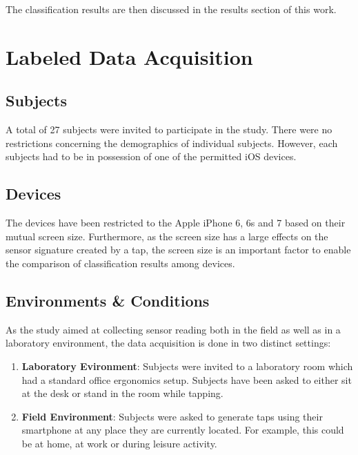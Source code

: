 The classification results are then discussed in the results section of this work.



\section{Labeled Data Acquisition}

\subsection{Subjects}
A total of 27 subjects were invited to participate in the study. There were no restrictions concerning the demographics of individual subjects. However, each subjects had to be in  possession of one of the permitted iOS devices.

\subsection{Devices}
The devices have been restricted to the Apple iPhone 6, 6s and 7 based on their mutual screen size. Furthermore, as the screen size has a large effects on the sensor signature created by a tap, the screen size is an important factor to enable the comparison of classification results among devices.

\subsection{Environments \& Conditions}
As the study aimed at collecting sensor reading both in the field as well as in a laboratory environment, the data acquisition is done in two distinct settings:
\begin{enumerate}
  \item \textbf{Laboratory Evironment}: Subjects were invited to a laboratory room which had a standard office ergonomics setup. Subjects have been asked to either sit at the desk or stand in the room while tapping.
  \item \textbf{Field Environment}: Subjects were asked to generate taps using their smartphone at any place they are currently located. For example, this could be at home, at work or during leisure activity.
\end{enumerate}


